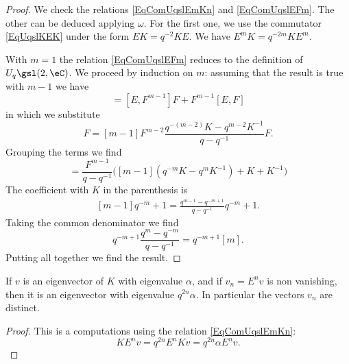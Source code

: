 \begin{proof}
    We check the relations \eqref{EqComUqslEmKn} and \eqref{EqComUqslEFm}. The other can be deduced applying \( \omega\). For the first one, we use the commutator \eqref{EqUqslKEK} under the form \( EK=q^{-2}KE\). We have \( E^mK=q^{-2m}KE^m\).

    With \( m=1\) the relation \eqref{EqComUqslEFm} reduces to the definition of \( U_q\gsl(2,\eC)\). We proceed by induction on \( m\): assuming that the result is true with \( m-1\) we have
    \begin{equation}
        [E,F^{m}]=[E,F^{m-1}]F+F^{m-1}[E,F]
    \end{equation}
    in which we substitute
    \begin{equation}
        [E,F^{m-1}]F=[m-1]F^{m-2}\frac{ q^{-(m-2)}K-q^{m-2}K^{-1} }{ q-q^{-1} }F.
    \end{equation}
    Grouping the terms we find
    \begin{equation}
        [E,F^{m}]=\frac{ F^{m-1} }{ q-q^{-1} }\Big( [m-1](q^{-m}K-q^mK^{-1})+K+K^{-1} \Big)
    \end{equation}
    The coefficient with \( K\) in the parenthesis is
    \begin{subequations}
        \begin{align}
            [m-1]q^{-m}+1=\frac{ q^{m-1}-q^{-m+1} }{ q-q^{-1} }q^{-m}+1.
        \end{align}
    \end{subequations}
    Taking the common denominator we find
    \begin{equation}
        q^{-m+1}\frac{ q^m-q^{-m} }{ q-q^{-1} }=q^{-m+1}[m].
    \end{equation}
    Putting all together we find the result.
\end{proof}

\begin{corollary}       \label{CorvKEnvKvaep}
    If \( v\) is an eigenvector of \( K\) with eigenvalue \( \alpha\), and if \( v_n=E^nv\) is non vanishing, then it is an eigenvector with eigenvalue \( q^{2n}\alpha\). In particular the vectors \( v_n\) are distinct.
\end{corollary}
    
\begin{proof}
    This is a computations using the relation \eqref{EqComUqslEmKn}:
    \begin{equation}
        KE^nv=q^{2n}E^nKv=q^{2n}\alpha E^nv.
    \end{equation}
\end{proof}


